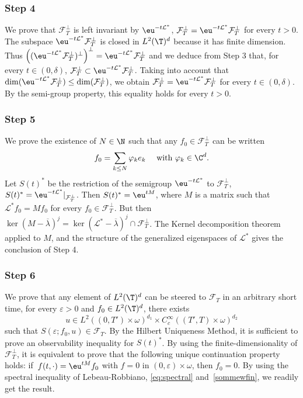 \subsubsection*{Step 4}
We prove that $\mathcal{F}_{T}^{\perp}$ is left invariant by $\eu^{-t {\mathcal{L}^*}}$, \ie $\mathcal{F}_{T}^{\perp}=\eu^{-t {\mathcal{L}^*}} \mathcal{F}_{T}^{\perp}$ for every $t>0$.
The subspace $\eu^{-t {\mathcal{L}^*}} \mathcal{F}_{T}^{\perp}$ is closed in $L^2(\T)^d$ because it has finite dimension. Thus
$\left((\eu^{-t {\mathcal{L}^*}} \mathcal{F}_{T}^{\perp})^\perp \right)^\perp=\eu^{-t {\mathcal{L}^*}} \mathcal{F}_{T}^{\perp}$
and we deduce from Step 3 that, for every $t\in(0,\delta)$, $\mathcal{F}_{T}^\perp \subset \eu^{-t {\mathcal{L}^*}} \mathcal{F}_{T}^{\perp}$.
Taking into account that $\dim(\eu^{-t {\mathcal{L}^*}} \mathcal{F}_{T}^{\perp}) \leq \dim(\mathcal{F}_{T}^{\perp})$, we obtain $\mathcal{F}_{T}^\perp = \eu^{-t {\mathcal{L}^*}} \mathcal{F}_{T}^{\perp}$ for every $t\in(0,\delta)$. By the semi-group property, this equality holds for every $t >0$.

\subsubsection*{Step 5}
We prove the existence of $N\in\N$ such that any
$f_0 \in \mathcal{F}_{T}^{\perp}$ can be written\vspace*{-3pt}
\begin{equation}
f_0 = \sum_{k \leq N} \varphi_k e_k \quad \text{ with } \varphi_k \in \C^d.
\label{sommewfin}
\end{equation}
Let ${S}(t)^*$ be the restriction of the semigroup $\eu^{-t {\mathcal{L}^*}}$ to
$\mathcal{F}_{T}^{\perp}$, \ie ${S}(t)^* = \eu^{-t
{\mathcal{L}^*}}|_{\mathcal{F}_{T}^{\perp}}$. Then ${S}(t)^*=\eu^{tM}$, where $M$ is a matrix
such that ${\mathcal{L}^*} f_0 = M f_0$ for every $f_0 \in \mathcal{F}_{T}^{\perp}$. But then
$\ker(M-\overline{\lambda})^{j} = \ker({\mathcal{L}^*}-\overline{\lambda})^{j} \cap
\mathcal{F}_{T}^\perp$. The Kernel decomposition theorem applied to $M$, and the structure of
the generalized eigenspaces of $\mathcal{L}^*$ gives the conclusion of Step 4.

\subsubsection*{Step 6}
We prove that any element of $L^2(\T)^{d}$ can be steered to $\mathcal{F}_{T}$ in an arbitrary short time, \ie for every $\varepsilon >0$ and $f_0 \in L^2(\T)^{d}$, there exists
\[
u \in L^2((0,T')\times\omega)^{d_1} \times C^\infty_c ((T',T)\times\omega)^{d_2}
\]
such that $S(\varepsilon;f_0, u) \in \mathcal{F}_{T}$.
By the Hilbert Uniqueness Method, it is sufficient to prove an observability inequality for ${S}(t)^*$. By using the finite-dimensionality of $\mathcal{F}_{T}^{\perp}$, it is equivalent to prove that the following unique continuation property holds: if~$f(t,\cdot)=\eu^{tM} f_0$ with $f=0$ in $(0,\varepsilon)\times \omega$, then $f_0 = 0$. By using the spectral inequality of Lebeau-Robbiano, \ie \eqref{eq:spectral} and~\eqref{sommewfin}, we readily get the result.

